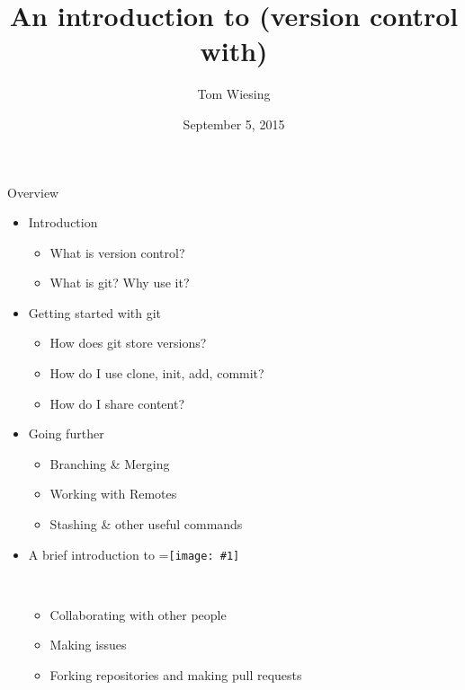 \documentclass{beamer}
\title{An introduction to (version control with) \logoimage{imgs/git_logo}{40px}}
\author{Tom Wiesing}
\institute{CS Club}
\date{September 5, 2015}
\newcommand{\logoimage}[2]{\begingroup
\setbox0=\hbox{\texttt{[image: \#1]}}%
\parbox{\wd0}{\box0}\endgroup\ }
\newcommand{\github}{\logoimage{imgs/github_logo}{8pt}}
\begin{document}
    \frame{\titlepage}
    
    \begin{frame}{Overview}
      \begin{itemize}
          \item Introduction
          \begin{itemize}
            \item What is version control?
            \item What is git? Why use it?
          \end{itemize}
          \item Getting started with git
          \begin{itemize}
            \item How does git store versions?
            \item How do I use clone, init, add, commit?
            \item How do I share content?
          \end{itemize}
          \item Going further
          \begin{itemize}
            \item Branching \& Merging
            \item Working with Remotes
            \item Stashing \& other useful commands
          \end{itemize}
          \item A brief introduction to \github
          \begin{itemize}
            \item Collaborating with other people
            \item Making issues
            \item Forking repositories and making pull requests
          \end{itemize}
      \end{itemize}
    \end{frame}
    
    
    
    
    

    
\end{document}
